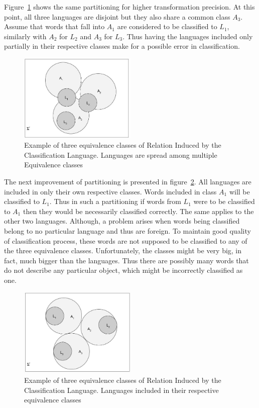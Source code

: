 \documentclass{mini}
\begin{document}
Figure~\ref{fig:eq_classes_high_precision} shows the same partitioning for higher transformation precision. At this point, all three languages are disjoint but they also share a common class $A_{3}$. Assume that words that fall into $A_{1}$ are considered to be classified to $L_{1}$, similarly with $A_{2}$ for $L_{2}$ and $A_{3}$ for $L_{3}$. Thus having the languages included only partially in their respective classes make for a possible error in classification.

\begin{figure}[H]
    \centering
    \includegraphics[width=0.5\textwidth]{./images/equivalence_classes_high_pt.jpg}
    \caption{Example of three equivalence classes of Relation Induced by the Classification Language. Languages are spread among multiple Equivalence classes}
    \label{fig:eq_classes_high_precision}
\end{figure}

The next improvement of partitioning is presented in figure~\ref{fig:eq_classes}. All languages are included in only their own respective classes. Words included in class $A_{1}$ will be classified to $L_{1}$. Thus in such a partitioning if words from $L_{1}$ were to be classified to $A_{1}$ then they would be necessarily classified correctly. The same applies to the other two languages. Although, a problem arises when words being classified belong to no particular language and thus are foreign. To maintain good quality of classification process, these words are not supposed to be classified to any of the three equivalence classes. Unfortunately, the classes might be very big, in fact, much bigger than the languages. Thus there are possibly many words that do not describe any particular object, which might be incorrectly classified as one. 

\begin{figure}[H]
    \centering
    \includegraphics[width=0.5\textwidth]{./images/equivalence_classes.jpg}
    \caption{Example of three equivalence classes of Relation Induced by the Classification Language. Languages included in their respective equivalence classes}
    \label{fig:eq_classes}
\end{figure}
\end{document}
